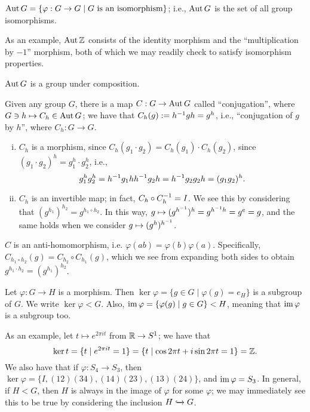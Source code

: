 \begin{definition}
    $\operatorname{Aut} G = \{\varphi : G \to G \mid G \text{ is an isomorphism}\}$; i.e., $\operatorname{Aut} G$ is the set of all group isomorphisms.
\end{definition}
\noindent As an example, $\operatorname{Aut} \mathbb Z$ consists of the identity morphism and the ``multiplication by $-1$'' morphism, both of which we may readily check to satisfy isomorphism properties.
\begin{claim}
    $\operatorname{Aut} G$ is a group under composition.
\end{claim}
\noindent Given any group $G$, there is a map $C : G \to \operatorname{Aut} G$ called ``conjugation'', where $G \ni h \mapsto C_h \in \operatorname{Aut} G$; we have that $C_h(g) := h^{-1} g h = g^h$, i.e., ``conjugation of $g$ by $h$'', where $C_h : G \to G$.
\begin{enumerate}[(i)]
    \item $C_h$ is a morphism, since $C_h(g_1 \cdot g_2) = C_h (g_1) \cdot C_h(g_2)$, since $(g_1 \cdot g_2)^h = g_1^h \cdot g_2^h$, i.e.,
    \[ g_1^h g_2^h = h ^{-1} g_1 h h ^{-1} g_2 h = h ^{-1} g_2 g_2 h = (g_1 g_2)^h. \]
    \item $C_h$ is an invertible map; in fact, $C_h \circ C_h ^{-1} = I$. We see this by considering that $(g^{h_1})^{h_2} = g^{h_1 \circ h_2}$. In this way, $g \mapsto (g^{h ^{-1}})^h = g^{h^{-1} h} = g^e = g$, and the same holds when we consider $g \mapsto (g^h)^{h ^{-1}}$.
\end{enumerate}
\begin{claim}
    $C$ is an anti-homomorphism, i.e. $\varphi(ab) = \varphi(b) \varphi(a)$. Specifically, $C_{h_1 \circ h_2}(g) = C_{h_2} \circ C_{h_1}(g)$, which we see from expanding both sides to obtain $g^{h_1 \cdot h_2} = (g^{h_1})^{h_2}$.
\end{claim}
\begin{claim}
    Let $\varphi : G \to H$ is a morphism. Then $\ker \varphi = \{g \in G \mid \varphi(g) = e_H\}$ is a subgroup of $G$. We write $\ker \varphi < G$. Also, $\operatorname{im} \varphi = \{\varphi(g) \mid g \in G\} < H$, meaning that $\operatorname{im} \varphi$ is a subgroup too.
\end{claim}
\noindent As an example, let $t \mapsto e^{2\pi i t}$ from $\mathbb R \to S^1$; we have that
\[ \ker t = \{t \mid e^{2 \pi i t} = 1\} = \{t \mid \cos 2\pi t + i \sin 2\pi t = 1\} = \mathbb Z. \]
We also have that if $\varphi : S_4 \to S_3$, then $\ker \varphi = \{I, (1 2)(3 4), (1 4)(2 3), (1 3)(2 4)\}$, and $\operatorname{im} \varphi = S_3$. In general, if $H < G$, then $H$ is always in the image of $\varphi$ for some $\varphi$; we may immediately see this to be true by considering the inclusion $H \xhookrightarrow{} G$.
